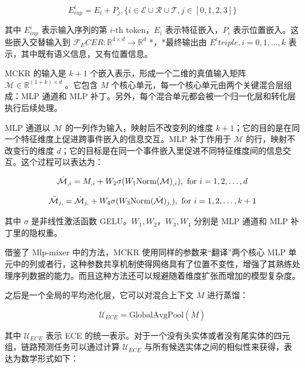 \documentclass[a4paper, AutoFakeBold]{article}
\begin{document}
\begin{equation}
E^i_{inp}=E_i+P_j,\{i\in{\mathcal E}\cup{\mathcal R}\cup{\mathcal T},j\in[0,1,2,3]\}
\end{equation}

其中 $E^i_{inp}$ 表示输入序列的第 $i\text{-th}$ token，$E_i$ 表示特征嵌入，$P_i$ 表示位置嵌入。这些嵌入交替输入到 ${\mathcal F}_ECER:{\mathbb R}^{4\times d}\rightarrow {\mathbb R}^d$ *，*最终输出由 $E^i{triple},i=0,1,\dots,k$ 表示，其中既有语义信息，又有位置信息。


MCKR 的输入是 $k+1$ 个嵌入表示，形成一个二维的真值输入矩阵 ${\mathcal M}\in{\mathbb R}^{(1+k)\times d}$ 。它包含 $M$ 个核心单元，每一个核心单元由两个关键混合层组成：MLP 通道和 MLP 补丁。另外，每个混合单元都会被一个归一化层和转化层执行后续处理。

MLP 通道以 ${\mathcal M}$ 的一列作为输入，映射后不改变列的维度 $k+1$；它的目的是在同一个特征维度上促进跨事件嵌入的信息交互。MLP 补丁作用于 ${\mathcal M}$ 的行，映射不改变行的维度 $d$；它的目标是在同一个事件嵌入里促进不同特征维度间的信息交互。这个过程可以表达为：

\begin{equation}
\dot{\mathcal M}_{\*,i}=M_{\*,i}+W_2\sigma(W_1\text{Norm}({\mathcal M})_{\*,i}),\ \text{for}\ i=1,2,\dots,d
\end{equation}

\begin{equation}
\ddot{\mathcal M}_{j,\*}=\dot{\mathcal M}_{j,\*}+W_4\sigma(W_3\text{Norm}(\dot{\mathcal M})_{j,\*}),\ \text{for}\ i=1,2,\dots,k+1
\end{equation}

其中 $\sigma$ 是非线性激活函数 GELU。$W_1,W_2$，$W_3,W_4$ 分别是 MLP 通道和 MLP 补丁里的隐权重。

借鉴了 Mlp-mixer 中的方法，MCKR 使用同样的参数来“翻译”两个核心 MLP 单元中的列或者行，这种参数共享机制使得网络具有了位置不变性，增强了其熟练处理序列数据的能力。而且这种方法还可以规避随着维度扩张而增加的模型复杂度。

之后是一个全局的平均池化层，它可以对混合上下文 $\ddot{M}$ 进行蒸馏：

\begin{equation}
{\mathcal U}_{ECE}=\text{GlobalAvgPool}(\ddot{M})
\end{equation}

其中 ${\mathcal U}_{ECE}$ 表示 ECE 的统一表示。对于一个没有头实体或者没有尾实体的四元组，链路预测任务可以通过计算 ${\mathcal U}_{ECE}$ 与所有候选实体之间的相似性来获得，表达为数学形式如下：
\end{document}
